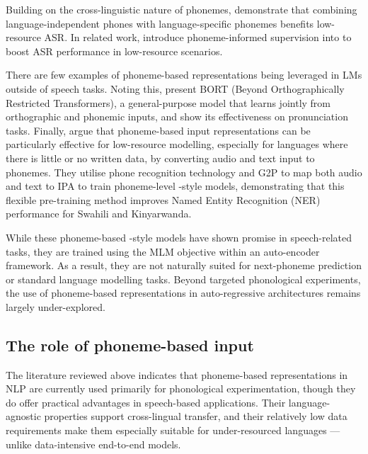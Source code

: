 Building on the cross-linguistic nature of phonemes, \citet{li2020universal} demonstrate that combining language-independent phones with language-specific phonemes benefits low-resource ASR. In related work, \citet{feng-2023-language-universal-phonetic} introduce phoneme-informed supervision into  to boost ASR performance in low-resource scenarios.

There are few examples of phoneme-based representations being leveraged in LMs outside of speech tasks. Noting this, \citet{gale-etal-2023-bort} present BORT (Beyond Orthographically Restricted Transformers), a general-purpose model that learns jointly from orthographic and phonemic inputs, and show its effectiveness on pronunciation tasks. Finally, \citet{leong-2022-phone} argue that phoneme-based input representations can be particularly effective for low-resource modelling, especially for languages where there is little or no written data, by converting audio and text input to phonemes. They utilise phone recognition technology and G2P to map both audio and text to IPA to train phoneme-level \bert-style models, demonstrating that this flexible pre-training method improves Named Entity Recognition (NER) performance for Swahili and Kinyarwanda. 


While these phoneme-based \bert-style models have shown promise in speech-related tasks, they are trained using the MLM objective within an auto-encoder framework. As a result, they are not naturally suited for next-phoneme prediction or standard language modelling tasks. Beyond targeted phonological experiments, the use of phoneme-based representations in auto-regressive architectures remains largely under-explored.

\subsection{The role of phoneme-based input}\label{sec:12-phoneval}

The literature reviewed above indicates that phoneme-based representations in NLP are currently used primarily for phonological experimentation, though they do offer practical advantages in speech-based applications. Their language-agnostic properties support cross-lingual transfer, and their relatively low data requirements make them especially suitable for under-resourced languages --- unlike data-intensive end-to-end models.


